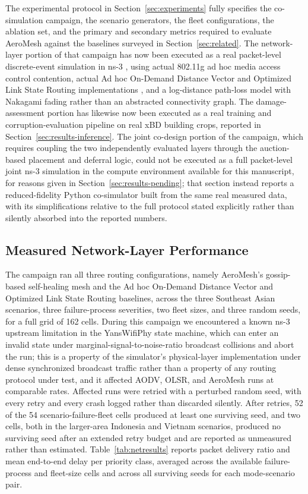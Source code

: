 \documentclass[drones,article,submit,moreauthors]{Definitions/mdpi}
\begin{document}
The experimental protocol in Section~\ref{sec:experiments} fully specifies the co-simulation campaign, the scenario generators, the fleet configurations, the ablation set, and the primary and secondary metrics required to evaluate AeroMesh against the baselines surveyed in Section~\ref{sec:related}. The network-layer portion of that campaign has now been executed as a real packet-level discrete-event simulation in ns-3 \cite{riley2010ns3}, using actual 802.11g ad hoc media access control contention, actual Ad hoc On-Demand Distance Vector and Optimized Link State Routing implementations \cite{perkins2003aodv,clausen2003olsr}, and a log-distance path-loss model with Nakagami fading rather than an abstracted connectivity graph. The damage-assessment portion has likewise now been executed as a real training and corruption-evaluation pipeline on real xBD building crops, reported in Section~\ref{sec:results-inference}. The joint co-design portion of the campaign, which requires coupling the two independently evaluated layers through the auction-based placement and deferral logic, could not be executed as a full packet-level joint ns-3 simulation in the compute environment available for this manuscript, for reasons given in Section~\ref{sec:results-pending}; that section instead reports a reduced-fidelity Python co-simulator built from the same real measured data, with its simplifications relative to the full protocol stated explicitly rather than silently absorbed into the reported numbers.

\subsection{Measured Network-Layer Performance}
\label{sec:results-network}

The campaign ran all three routing configurations, namely AeroMesh's gossip-based self-healing mesh and the Ad hoc On-Demand Distance Vector and Optimized Link State Routing baselines, across the three Southeast Asian scenarios, three failure-process severities, two fleet sizes, and three random seeds, for a full grid of 162 cells. During this campaign we encountered a known ns-3 upstream limitation in the YansWifiPhy state machine, which can enter an invalid state under marginal-signal-to-noise-ratio broadcast collisions and abort the run; this is a property of the simulator's physical-layer implementation under dense synchronized broadcast traffic rather than a property of any routing protocol under test, and it affected AODV, OLSR, and AeroMesh runs at comparable rates. Affected runs were retried with a perturbed random seed, with every retry and every crash logged rather than discarded silently. After retries, 52 of the 54 scenario-failure-fleet cells produced at least one surviving seed, and two cells, both in the larger-area Indonesia and Vietnam scenarios, produced no surviving seed after an extended retry budget and are reported as unmeasured rather than estimated. Table~\ref{tab:netresults} reports packet delivery ratio and mean end-to-end delay per priority class, averaged across the available failure-process and fleet-size cells and across all surviving seeds for each mode-scenario pair.
\end{document}
